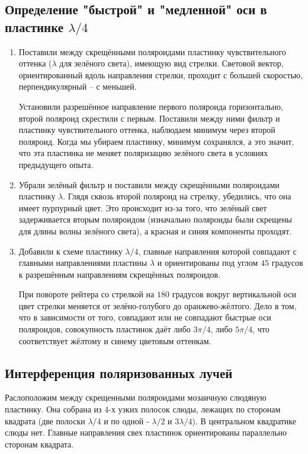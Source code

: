 \documentclass[a4paper,12pt]{article}
\begin{document}
\subsection{Определение "быстрой" и "медленной" оси в пластинке $\lambda/4$}
\begin{enumerate}
    \item Поставили между скрещёнными поляроидами пластинку чувствительного оттенка ($\lambda$ для зелёного света), имеющую вид стрелки. Световой вектор, ориентированный вдоль направления стрелки, проходит с большей скоростью, перпендикулярный -- с меньшей.
    
    Установили разрешённое направление первого поляроида горизонтально, второй поляроид скрестили с первым. Поставили между ними фильтр и пластинку чувствительного оттенка, наблюдаем минимум через второй поляроид. Когда мы убираем пластинку, минимум сохранялся, а это значит, что эта пластинка не меняет поляризацию зелёного света в условиях предыдущего опыта.

    \item Убрали зелёный фильтр и поставили между скрещёнными поляроидами пластинку $\lambda$. Глядя сквозь второй поляроид на стрелку, убедились, что она имеет пурпурный цвет. Это происходит из-за того, что зелёный свет задерживается вторым поляроидом (изначально поляроиды были скрещены для длины волны зелёного света), а красная и синяя компоненты проходят.

    \item Добавили к схеме пластинку $\lambda/4$, главные направления которой совпадают с главными направлениями пластины $\lambda$ и ориентированы под углом $45$ градусов к разрешённым направлениям скрещённых поляроидов.
    
    При повороте рейтера со стрелкой на $180$ градусов вокруг вертикальной оси цвет стрелки меняется от зелёно-голубого до оранжево-жёлтого. Дело в том, что в зависимости от того, совпадают или не совпадают быстрые оси поляроидов, совокупность пластинок даёт либо $3\pi/4$, либо $5\pi/4$, что соответствует жёлтому и синему цветовым оттенкам. 
\end{enumerate}

\subsection{Интерференция поляризованных лучей}

Раслоположим между скрещенными поляроидами мозаичную слюдяную пластинку. Она собрана из 4-х узких полосок слюды, лежащих по сторонам квадрата (две полоски $\lambda/4$ и по одной - $\lambda/2$ и $3\lambda/4$). В центральном квадратике слюды нет. Главные направления свех пластинок ориентированы параллельно сторонам квадрата.
\end{document}
